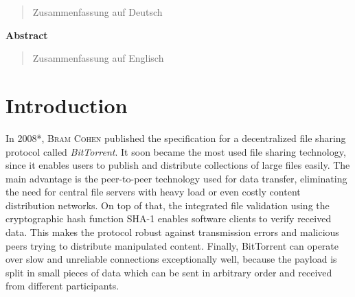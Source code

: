 \documentclass[10pt, a4paper, twoside, headsepline]{scrbook}
\renewcommand{\_}{\origunderscore\allowbreak}
\begin{document}
\begin{quote}
Zusammenfassung auf Deutsch
\end{quote}

\vspace*{\fill}
\begin{center}
{\large\textbf{Abstract}}
\end{center}

\begin{quote}
Zusammenfassung auf Englisch
\end{quote}
\vspace*{\fill}

\tableofcontents

\listoffigures

\listoftables

\chapter{Introduction}
\pagestyle{headings}
In 2008*, \textsc{Bram Cohen} published the specification for a decentralized file sharing protocol called \emph{BitTorrent}. It soon became the most used file sharing technology, since it enables users to publish and distribute collections of large files easily. The main advantage is the peer-to-peer technology used for data transfer, eliminating the need for central file servers with heavy load or even costly content distribution networks. On top of that, the integrated file validation using the cryptographic hash function SHA-1 enables software clients to verify received data. This makes the protocol robust against transmission errors and malicious peers trying to distribute manipulated content. Finally, BitTorrent can operate over slow and unreliable connections exceptionally well, because the payload is split in small pieces of data which can be sent in arbitrary order and received from different participants.
\end{document}

